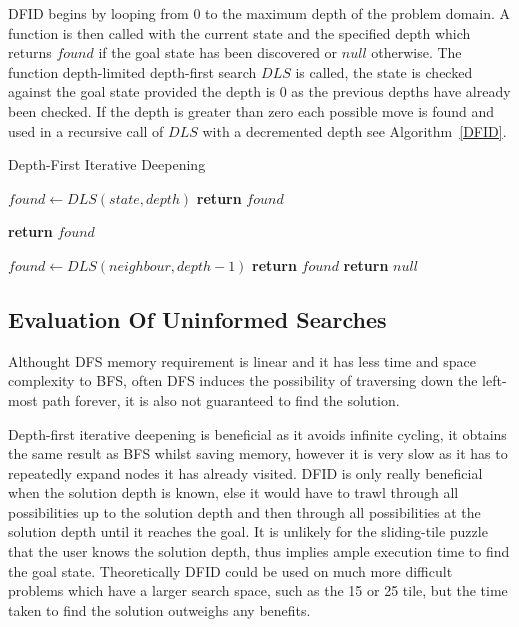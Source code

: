 \documentclass[final]{cmpreport}
\begin{document}
DFID begins by looping from 0 to the maximum depth of the problem domain. A function is then called with the current state and the specified depth which returns $found$ if the goal state has been discovered or $null$ otherwise. The function depth-limited depth-first search $DLS$ is called, the state is checked against the goal state provided the depth is 0 as the previous depths have already been checked. If the depth is greater than zero each possible move is found and used in a recursive call of $DLS$ with a decremented depth see Algorithm~\ref{DFID}. 

\makeatletter
\def\BState{\State\hskip-\ALG@thistlm}
\makeatother



	\begin{algorithm}
	\caption{Depth-First Iterative Deepening}\label{DFID}
	\begin{algorithmic}[1]
		\State$ found \gets DLS(state, depth)$
		\State \textbf{return} $found$
		\EndIf
		\EndFor
		\EndProcedure
		
		\State \textbf{return} $found$
		\EndIf
		
		\State $found \gets DLS(neighbour, depth-1)$
		\State \textbf{return} $found$
		\EndIf
		\EndFor
		\EndIf 
		\State \textbf{return} $null$
		\EndProcedure
	\end{algorithmic}	
\end{algorithm}	




\subsection{Evaluation Of Uninformed Searches}
Althought DFS memory requirement is linear and it has less time and space complexity to BFS, often DFS induces the possibility of traversing down the left-most path forever, it is also not guaranteed to find the solution.

Depth-first iterative deepening is beneficial as it avoids infinite cycling, it obtains the same result as BFS whilst saving memory, however it is very slow as it has to repeatedly expand nodes it has already visited. DFID is only really beneficial when the solution depth is known, else it would have to trawl through all possibilities up to the solution depth and then through all possibilities at the solution depth until it reaches the goal. It is unlikely for the sliding-tile puzzle that the user knows the solution depth, thus implies ample execution time to find the goal state. Theoretically DFID could be used on much more difficult problems which have a larger search space, such as the 15 or 25 tile, but the time taken to find the solution outweighs any benefits. 
\end{document}
